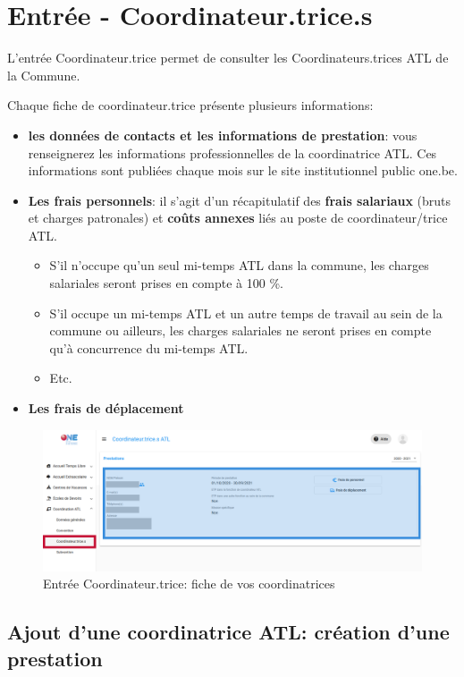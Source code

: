 \section{Entrée - Coordinateur.trice.s}
L'entrée Coordinateur.trice permet de consulter les Coordinateurs.trices ATL de la Commune. 

Chaque fiche de coordinateur.trice présente plusieurs informations: 
\begin{itemize}
    \item \textbf{les données de contacts et les informations de prestation}: vous renseignerez les informations professionnelles de la coordinatrice ATL. Ces informations sont publiées chaque mois sur le site institutionnel public one.be.
    \item \textbf{Les frais personnels}: il s’agit d’un récapitulatif des \textbf{frais salariaux} (bruts et charges patronales) et \textbf{coûts annexes} liés au poste de coordinateur/trice ATL.
    \begin{itemize}
    \item S’il n’occupe qu’un seul mi-temps ATL dans la commune, les charges salariales seront prises en compte à 100 \%.
    \item S’il occupe un mi-temps ATL et un autre temps de travail au sein de la commune ou ailleurs, les charges salariales ne seront prises en compte qu’à concurrence du mi-temps ATL.
    \item Etc. 
    \end{itemize}
    \item \textbf{Les frais de déplacement}
\end{itemize}


\begin{figure}[htbp]
    \centering
    \includegraphics[width=12cm]{Images/catl/catl_prestation.png}
    \caption{Entrée Coordinateur.trice: fiche de vos coordinatrices}
    \label{fig:catl_prestation}
\end{figure}


\subsection{Ajout d'une coordinatrice ATL: création d'une prestation}



